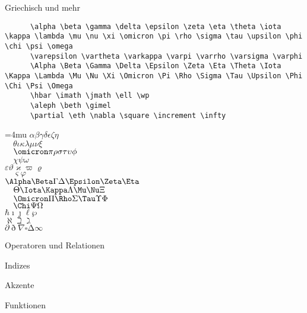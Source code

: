 \begin{frame}[fragile]{Griechisch und mehr}
  \begin{CodeExample}{0.70}
    \begin{lstlisting}
      \alpha \beta \gamma \delta \epsilon \zeta \eta \theta \iota \kappa \lambda \mu \nu \xi \omicron \pi \rho \sigma \tau \upsilon \phi \chi \psi \omega
      \varepsilon \vartheta \varkappa \varpi \varrho \varsigma \varphi
      \Alpha \Beta \Gamma \Delta \Epsilon \Zeta \Eta \Theta \Iota \Kappa \Lambda \Mu \Nu \Xi \Omicron \Pi \Rho \Sigma \Tau \Upsilon \Phi \Chi \Psi \Omega
      \hbar \imath \jmath \ell \wp
      \aleph \beth \gimel
      \partial \eth \nabla \square \increment \infty
    \end{lstlisting}
  \CodeResult
    \Umathordordspacing\textstyle=4mu
    $\alpha \beta \gamma \delta \epsilon \zeta \eta$ \\
    $\quad \theta \iota \kappa \lambda \mu \nu \xi$ \\
    $\quad \omicron \pi \rho \sigma \tau \upsilon \phi$ \\
    $\quad \chi \psi \omega$ \\
    $\varepsilon \vartheta \varkappa \varpi \varrho$ \\
    $\quad \varsigma \varphi$ \\
    $\Alpha \Beta \Gamma \Delta \Epsilon \Zeta \Eta$ \\
    $\quad \Theta \Iota \Kappa \Lambda \Mu \Nu \Xi$ \\
    $\quad \Omicron \Pi \Rho \Sigma \Tau \Upsilon \Phi$ \\
    $\quad \Chi \Psi \Omega$ \\
    $\hbar \imath \jmath \ell \wp$ \\
    $\aleph \beth \gimel$ \\
    $\partial \eth \nabla \square \increment \infty$
  \end{CodeExample}
\end{frame}

\begin{frame}{Operatoren und Relationen}
\end{frame}

\begin{frame}{Indizes}
\end{frame}

\begin{frame}{Akzente}
\end{frame}

\begin{frame}{Funktionen}
\end{frame}

